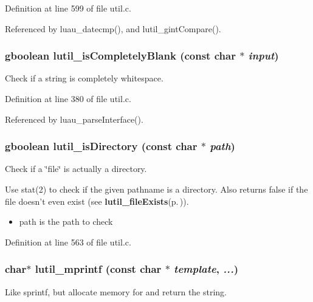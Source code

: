 Definition at line 599 of file util.c.

Referenced by luau\_\-datecmp(), and lutil\_\-gint\-Compare().
\subsubsection{\setlength{\rightskip}{0pt plus 5cm}gboolean lutil\_\-is\-Completely\-Blank (const char $\ast$ {\em input})}\label{util_8h_a20}


Check if a string is completely whitespace. 



Definition at line 380 of file util.c.

Referenced by luau\_\-parse\-Interface().
\subsubsection{\setlength{\rightskip}{0pt plus 5cm}gboolean lutil\_\-is\-Directory (const char $\ast$ {\em path})}\label{util_8h_a28}


Check if a \char`\"{}file\char`\"{} is actually a directory. 

Use stat(2) to check if the given pathname is a directory. Also returns false if the file doesn't even exist (see {\bf lutil\_\-file\-Exists}{\rm (p.\,\pageref{util_8h_a27})}).

\begin{itemize}
\item path is the path to check 
\end{itemize}


Definition at line 563 of file util.c.
\subsubsection{\setlength{\rightskip}{0pt plus 5cm}char$\ast$ lutil\_\-mprintf (const char $\ast$ {\em template},  {\em ...})}\label{util_8h_a14}


Like sprintf, but allocate memory for and return the string. 


